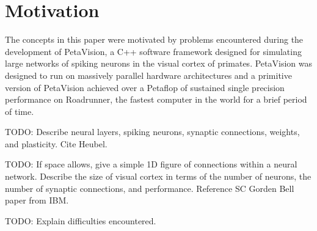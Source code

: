 \section{Motivation}

The concepts in this paper were motivated by problems encountered during
the development of PetaVision, a C++ software framework designed for simulating
large networks of spiking neurons in the visual cortex of primates.  PetaVision
was designed to run on massively parallel hardware architectures and a primitive
version of PetaVision achieved over a Petaflop of sustained single precision
performance on Roadrunner, the fastest computer in the world for a brief
period of time.

TODO: Describe neural layers, spiking neurons, synaptic connections, weights,
and plasticity. Cite Heubel.

TODO: If space allows, give a simple 1D figure of connections within a neural network.
Describe the size of visual cortex in terms of the number of neurons,
the number of synaptic connections, and performance.  Reference SC Gorden Bell
paper from IBM.

TODO: Explain difficulties encountered.
